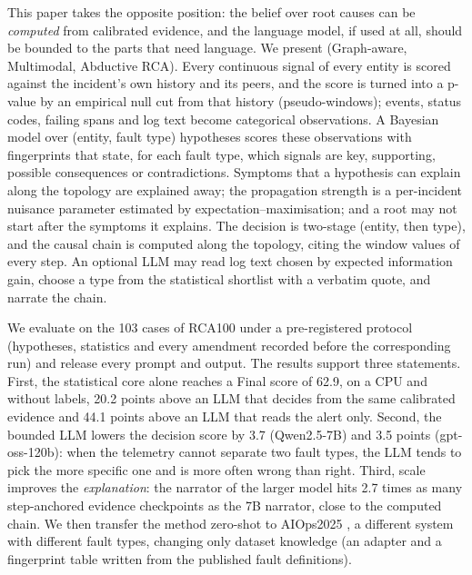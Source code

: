 This paper takes the opposite position: the belief over root causes can be \emph{computed} from calibrated evidence, and the
language model, if used at all, should be bounded to the parts that need language. We present \gama{} (Graph-aware, Multimodal,
Abductive RCA). Every continuous signal of every entity is scored against the incident's own history and its peers, and the score
is turned into a p-value by an empirical null cut from that history (pseudo-windows); events, status codes, failing spans and log
text become categorical observations. A Bayesian model over (entity, fault type) hypotheses scores these observations with
fingerprints that state, for each fault type, which signals are key, supporting, possible consequences or contradictions. Symptoms
that a hypothesis can explain along the topology are explained away; the propagation strength is a per-incident nuisance parameter
estimated by expectation--maximisation; and a root may not start after the symptoms it explains. The decision is two-stage (entity,
then type), and the causal chain is computed along the topology, citing the window values of every step. An optional LLM may read
log text chosen by expected information gain, choose a type from the statistical shortlist with a verbatim quote, and narrate the
chain.

We evaluate \gama{} on the 103 cases of RCA100 under a pre-registered protocol (hypotheses, statistics and every amendment
recorded before the corresponding run) and release every prompt and output. The results support three statements. First, the
statistical core alone reaches a Final score of 62.9, on a CPU and without labels, 20.2 points above an LLM that decides from the
same calibrated evidence and 44.1 points above an LLM that reads the alert only. Second, the bounded LLM lowers the decision score
by 3.7 (Qwen2.5-7B) and 3.5 points (gpt-oss-120b): when the telemetry cannot separate two fault types, the LLM tends to pick the
more specific one and is more often wrong than right. Third, scale improves the \emph{explanation}: the narrator of the larger model
hits 2.7 times as many step-anchored evidence checkpoints as the 7B narrator, close to the computed chain. We then transfer the
method zero-shot to AIOps2025 \citep{cai2026benchmark}, a different system with different fault types, changing only
dataset knowledge (an adapter and a fingerprint table written from the published fault definitions).

